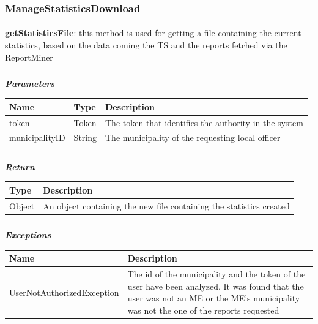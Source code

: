 				\subsubsection{ManageStatisticsDownload}
					\paragraph{}
							\textbf{getStatisticsFile}: this method is used for getting a file containing the current statistics, based on the data coming the TS and the reports fetched via the ReportMiner
							\subparagraph{}
							\textit{\textbf{Parameters}}
								\begin{table}[!h]
									\begin{tabular}{L{0.2\textwidth}L{0.2\textwidth}L{0.2\textwidth}}
										\toprule
										Name & Type & Description \\
										\midrule
								  		token & Token & The token that identifies the authority in the system \\
								  		municipalityID & String & The municipality of the requesting local officer \\
								 		\bottomrule
									\end{tabular}
								\end{table}
							\subparagraph{}
								\textit{\textbf{Return}}
									\begin{table}[!h]
									\begin{tabular}{L{0.3\textwidth}L{0.3\textwidth}}
										\toprule
										Type & Description \\
										\midrule
								  		Object & An object containing the new file containing the statistics created \\
								 		\bottomrule
									\end{tabular}
								\end{table}
							\subparagraph{}
								\textit{\textbf{Exceptions}}
									\begin{table}[!h]
									\begin{tabular}{L{0.3\textwidth}L{0.3\textwidth}}
										\toprule
										Name & Description \\
										\midrule
								  		UserNotAuthorizedException & The id of the municipality and the token of the user have been analyzed. It was found that the user was not an ME or the ME's  municipality was not the one of the reports requested  \\
								 		\bottomrule
									\end{tabular}
								\end{table}
								
